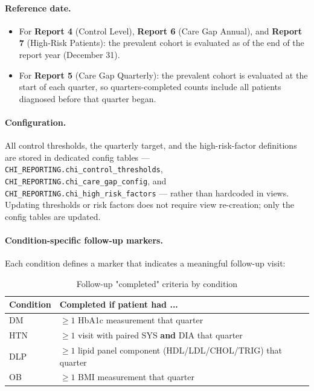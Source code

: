 \documentclass[11pt,a4paper]{article}
\begin{document}
\paragraph{Reference date.}
\begin{itemize}[leftmargin=*]
    \item For \textbf{Report 4} (Control Level), \textbf{Report 6} (Care Gap Annual), and \textbf{Report 7} (High-Risk Patients): the prevalent cohort is evaluated as of the end of the report year (December 31).
    \item For \textbf{Report 5} (Care Gap Quarterly): the prevalent cohort is evaluated at the start of each quarter, so quarters-completed counts include all patients diagnosed before that quarter began.
\end{itemize}

\paragraph{Configuration.}
All control thresholds, the quarterly target, and the high-risk-factor definitions are stored in dedicated config tables --- \texttt{CHI\_REPORTING.chi\_control\_thresholds}, \texttt{CHI\_REPORTING.chi\_care\_gap\_config}, and \texttt{CHI\_REPORTING.chi\_high\_risk\_factors} --- rather than hardcoded in views. Updating thresholds or risk factors does not require view re-creation; only the config tables are updated.

\paragraph{Condition-specific follow-up markers.}
Each condition defines a marker that indicates a meaningful follow-up visit:

\begin{table}[ht]
\centering
\caption{Follow-up "completed" criteria by condition}
\begin{tabular}{@{}ll@{}}
\toprule
\textbf{Condition} & \textbf{Completed if patient had ...} \\
\midrule
DM & $\geq 1$ HbA1c measurement that quarter \\
HTN & $\geq 1$ visit with paired SYS \textbf{and} DIA that quarter \\
DLP & $\geq 1$ lipid panel component (HDL/LDL/CHOL/TRIG) that quarter \\
OB  & $\geq 1$ BMI measurement that quarter \\
\bottomrule
\end{tabular}
\end{table}
\end{document}

